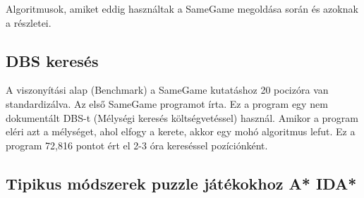 \documentclass{article}
\begin{document}
	Algoritmusok, amiket eddig használtak a SameGame megoldása során és azoknak a részletei.
	
	\subsection{DBS keresés}
	
	A viszonyítási alap (Benchmark) a SameGame kutatáshoz 20 pocizóra van standardizálva. Az első SameGame programot \cite{smith2006personal} írta. Ez a program egy nem dokumentált DBS-t (Mélységi keresés költségvetéssel) használ. Amikor a program eléri azt a mélységet, ahol elfogy a kerete, akkor egy mohó algoritmus lefut. Ez a program 72,816 pontot ért el 2-3 óra kereséssel pozíciónként.
	
	\subsection{Tipikus módszerek puzzle játékokhoz A* IDA*}
	
\end{document}
